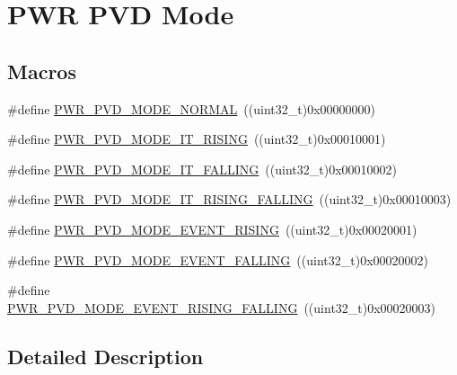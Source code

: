\hypertarget{group___p_w_r___p_v_d___mode}{}\section{P\+WR P\+VD Mode}
\label{group___p_w_r___p_v_d___mode}
\subsection*{Macros}
\begin{DoxyCompactItemize}
\item 
\#define \hyperlink{group___p_w_r___p_v_d___mode_ga3a4bf701a36a14a4edf4dc5a28153277}{P\+W\+R\+\_\+\+P\+V\+D\+\_\+\+M\+O\+D\+E\+\_\+\+N\+O\+R\+M\+AL}~((uint32\+\_\+t)0x00000000)
\item 
\#define \hyperlink{group___p_w_r___p_v_d___mode_ga102d7b8354419990a2a780f61cd020a6}{P\+W\+R\+\_\+\+P\+V\+D\+\_\+\+M\+O\+D\+E\+\_\+\+I\+T\+\_\+\+R\+I\+S\+I\+NG}~((uint32\+\_\+t)0x00010001)
\item 
\#define \hyperlink{group___p_w_r___p_v_d___mode_gab600a54f3a588de836cfe4b727ab8a53}{P\+W\+R\+\_\+\+P\+V\+D\+\_\+\+M\+O\+D\+E\+\_\+\+I\+T\+\_\+\+F\+A\+L\+L\+I\+NG}~((uint32\+\_\+t)0x00010002)
\item 
\#define \hyperlink{group___p_w_r___p_v_d___mode_gac531fbf14457e6595505354fad521b67}{P\+W\+R\+\_\+\+P\+V\+D\+\_\+\+M\+O\+D\+E\+\_\+\+I\+T\+\_\+\+R\+I\+S\+I\+N\+G\+\_\+\+F\+A\+L\+L\+I\+NG}~((uint32\+\_\+t)0x00010003)
\item 
\#define \hyperlink{group___p_w_r___p_v_d___mode_ga1a946b01887aa886de329a92c3ab0dd4}{P\+W\+R\+\_\+\+P\+V\+D\+\_\+\+M\+O\+D\+E\+\_\+\+E\+V\+E\+N\+T\+\_\+\+R\+I\+S\+I\+NG}~((uint32\+\_\+t)0x00020001)
\item 
\#define \hyperlink{group___p_w_r___p_v_d___mode_gaaedbe45f1a1ea6c30af6ac51abae0cae}{P\+W\+R\+\_\+\+P\+V\+D\+\_\+\+M\+O\+D\+E\+\_\+\+E\+V\+E\+N\+T\+\_\+\+F\+A\+L\+L\+I\+NG}~((uint32\+\_\+t)0x00020002)
\item 
\#define \hyperlink{group___p_w_r___p_v_d___mode_ga7455387c8e9049f9f66b46423d4f4091}{P\+W\+R\+\_\+\+P\+V\+D\+\_\+\+M\+O\+D\+E\+\_\+\+E\+V\+E\+N\+T\+\_\+\+R\+I\+S\+I\+N\+G\+\_\+\+F\+A\+L\+L\+I\+NG}~((uint32\+\_\+t)0x00020003)
\end{DoxyCompactItemize}


\subsection{Detailed Description}


